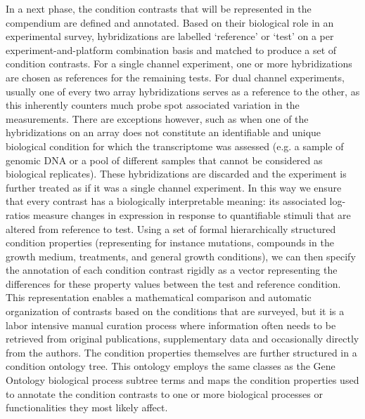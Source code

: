 In a next phase, the condition contrasts that will be represented in the 
compendium are defined and annotated. Based on their biological role in an 
experimental survey, hybridizations are labelled `reference' or `test' on a per 
experiment-and-platform combination basis and matched to produce a set of 
condition contrasts. For a single channel experiment, one or more 
hybridizations are chosen as references for the remaining tests. For dual 
channel experiments, usually one of every two array
hybridizations serves as a reference to the other, as this inherently counters 
much probe spot associated variation in the measurements. There are exceptions 
however, such as when one of the hybridizations on an array does not constitute 
an identifiable and unique biological condition for which the transcriptome was 
assessed (e.g. a sample of genomic DNA or a pool of different samples that 
cannot be considered as biological replicates). These hybridizations are 
discarded and the experiment is further treated as if it was a single channel 
experiment. In this way we ensure that every contrast has a biologically 
interpretable meaning: its associated log-ratios measure changes in expression 
in response to quantifiable stimuli that are altered from reference to test. 
Using a set of formal hierarchically structured condition properties 
(representing for instance mutations, compounds in the growth medium, 
treatments, and general growth conditions), we can then specify the annotation 
of each condition contrast rigidly as a vector representing the differences for 
these property values between the test and reference condition. This 
representation enables a mathematical comparison and automatic organization of 
contrasts based on the conditions that are surveyed, but it is a labor 
intensive manual curation process where information often needs to be retrieved 
from original publications, supplementary data and occasionally directly from 
the authors. The condition properties themselves are further structured in a 
condition ontology tree. This ontology employs the same classes as the Gene 
Ontology biological process subtree terms \cite{Gene2010} and maps the 
condition properties used to annotate the condition contrasts to one or more 
biological processes or functionalities they most likely affect.

